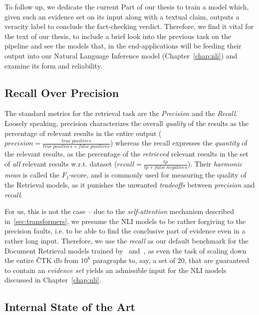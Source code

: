 To follow up, we dedicate the current Part of our thesis to train a model which, given such an evidence set on its input along with a textual claim, outputs a veracity label to conclude the fact-checking verdict. Therefore, we find it vital for the text of our thesis, to include a brief look into the previous task on the pipeline and see the models that, in the end-applications will be feeding their output into our Natural Language Inference model (Chapter~\ref{chap:nli}) and examine its form and reliability.



\subsection{Recall Over Precision}
\label{sec:recall}
The standard metrics for the retrieval task are the \textit{Precision} and the \textit{Recall}. Loosely speaking, precision characterizes the overall \textit{quality} of the results as the percentage of relevant results in the entire output ($precision=\frac{true~positives}{true~positives + false~positives}$) whereas the recall expresses the \textit{quantity} of the relevant results, as the percentage of the \textit{retrieved} relevant results in the set of \textit{all} relevant results w.r.t. dataset ($recall=\frac{tp}{tp+false~negatives}$). Their \textit{harmonic mean} is called the $F_1$-score, and is commonly used for measuring the quality of the Retrieval models, as it punishes the unwanted \textit{tradeoffs} between \textit{precision} and \textit{recall}.

For us, this is not the case -- due to the \textit{self-attention} mechanism described in~\ref{sec:transformers}, we presume the NLI models to be rather forgiving to the precision faults, i.e. to be able to find the conclusive part of evidence even in a rather long input. Therefore, we use the \textit{recall} as our default benchmark for the Document Retrieval models trained by~\cite{rypar} and~\cite{michal}, as even the task of scaling down the entire \textsf{ČTK db} from $10^8$ paragraphs to, say, a set of $20$, that are guaranteed to contain an \textit{evidence set} yields an admissible input for the NLI models discussed in Chapter~\ref{chap:nli}.

\subsection{Internal State of the Art}

